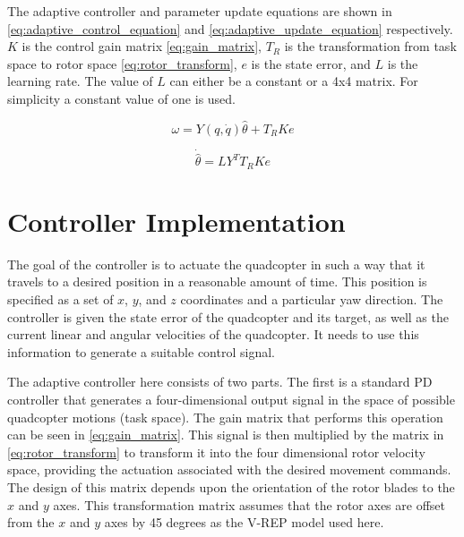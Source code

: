 \documentclass[letterpaper,12pt,titlepage,oneside,final]{book}
\begin{document}
The adaptive controller and parameter update equations are shown in \eqref{eq:adaptive_control_equation} and \eqref{eq:adaptive_update_equation} respectively.
$K$ is the control gain matrix \eqref{eq:gain_matrix}, $T_{R}$ is the transformation from task space to rotor space \eqref{eq:rotor_transform}, $e$ is the state error, and $L$ is the learning rate.
The value of $L$ can either be a constant or a 4x4 matrix.
For simplicity a constant value of one is used.

\begin{equation} \label{eq:adaptive_control_equation}
\omega = Y(q,\dot{q})\hat{\theta} + T_{R}Ke
\end{equation}

\begin{equation} \label{eq:adaptive_update_equation}
\dot{\hat{\theta}} = LY^{T}T_{R}Ke
\end{equation}


\section{Controller Implementation}


The goal of the controller is to actuate the quadcopter in such a way that it travels to a desired position in a reasonable amount of time. 
This position is specified as a set of $x$, $y$, and $z$ coordinates and a particular yaw direction. 
The controller is given the state error of the quadcopter and its target, as well as the current linear and angular velocities of the quadcopter. 
It needs to use this information to generate a suitable control signal.

The adaptive controller here consists of two parts. The first is a standard PD controller that generates a four-dimensional output signal in the space of possible quadcopter motions (task space). 
The gain matrix that performs this operation can be seen in \eqref{eq:gain_matrix}. 
This signal is then multiplied by the matrix in \eqref{eq:rotor_transform} to transform it into the four dimensional rotor velocity space, providing the actuation associated with the desired movement commands.
The design of this matrix depends upon the orientation of the rotor blades to the $x$ and $y$ axes. 
This transformation matrix assumes that the rotor axes are offset from the $x$ and $y$ axes by 45 degrees as the V-REP model used here.
\end{document}
